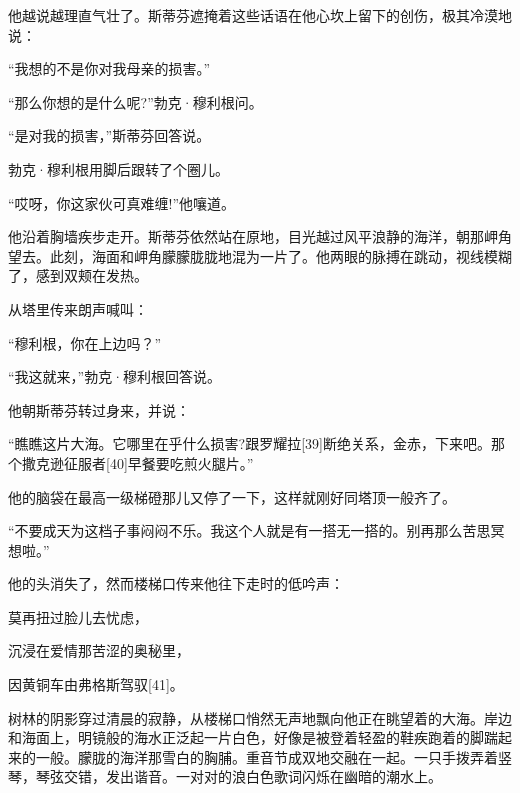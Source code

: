 \documentclass{article}
\begin{document}
他越说越理直气壮了。斯蒂芬遮掩着这些话语在他心坎上留下的创伤，极其冷漠地说：



“我想的不是你对我母亲的损害。”



“那么你想的是什么呢?”勃克·穆利根问。



“是对我的损害，”斯蒂芬回答说。



勃克·穆利根用脚后跟转了个圈儿。



“哎呀，你这家伙可真难缠!”他嚷道。



他沿着胸墙疾步走开。斯蒂芬依然站在原地，目光越过风平浪静的海洋，朝那岬角望去。此刻，海面和岬角朦朦胧胧地混为一片了。他两眼的脉搏在跳动，视线模糊了，感到双颊在发热。



从塔里传来朗声喊叫：



“穆利根，你在上边吗？”



“我这就来，”勃克·穆利根回答说。



他朝斯蒂芬转过身来，并说：



“瞧瞧这片大海。它哪里在乎什么损害?跟罗耀拉[39]断绝关系，金赤，下来吧。那个撒克逊征服者[40]早餐要吃煎火腿片。”



他的脑袋在最高一级梯磴那儿又停了一下，这样就刚好同塔顶一般齐了。



“不要成天为这档子事闷闷不乐。我这个人就是有一搭无一搭的。别再那么苦思冥想啦。”



他的头消失了，然而楼梯口传来他往下走时的低吟声：



莫再扭过脸儿去忧虑，



沉浸在爱情那苦涩的奥秘里，



因黄铜车由弗格斯驾驭[41]。



树林的阴影穿过清晨的寂静，从楼梯口悄然无声地飘向他正在眺望着的大海。岸边和海面上，明镜般的海水正泛起一片白色，好像是被登着轻盈的鞋疾跑着的脚踹起来的一般。朦胧的海洋那雪白的胸脯。重音节成双地交融在一起。一只手拨弄着竖琴，琴弦交错，发出谐音。一对对的浪白色歌词闪烁在幽暗的潮水上。
\end{document}
